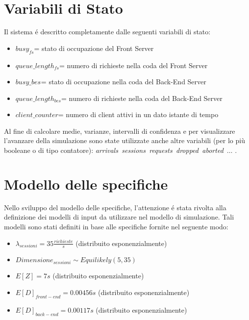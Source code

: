 \section{Variabili di Stato}
Il sistema \'e descritto completamente dalle seguenti variabili di stato:
\begin{itemize}
\item $busy_{fs}^{}$= stato di occupazione del Front Server
\item $queue\_length_{fs}^{}$= numero di richieste nella coda del Front Server
\item $busy\_{bes}^{}$= stato di occupazione nella coda del Back-End Server
\item $queue\_length_{bes}^{}$= numero di richieste nella coda del Back-End 
Server
\item $client\_counter$= numero di client attivi in un dato istante di tempo

\end{itemize}
Al fine di calcolare medie, varianze, intervalli di confidenza e per 
visualizzare l'avanzare della simulazione sono state utilizzate anche altre 
variabili (per lo più booleane o di tipo contatore): \textit{arrivals\, 
sessions\, requests\, dropped\, aborted\,} $…$ .

\section{Modello delle specifiche}
Nello sviluppo del modello delle specifiche, l'attenzione \'e stata rivolta alla 
definizione dei modelli di input da utilizzare nel modello di simulazione. Tali 
modelli sono stati definiti in base alle specifiche fornite nel seguente modo:

 \begin{itemize}
	\item $\lambda_{sessioni} = 35 \frac{richieste}{s}$ (distribuito 
esponenzialmente)
 	\item $Dimensione_{sessioni} \sim Equilikely(5, 35)$
 	\item $E[Z] = 7 s$ (distribuito esponenzialmente)
 	\item $E[D]_{front-end} = 0.00456 s$ (distribuito esponenzialmente)
 	\item $E[D]_{back-end} = 0.00117 s$ (distribuito esponenzialmente)
 \end{itemize} 

